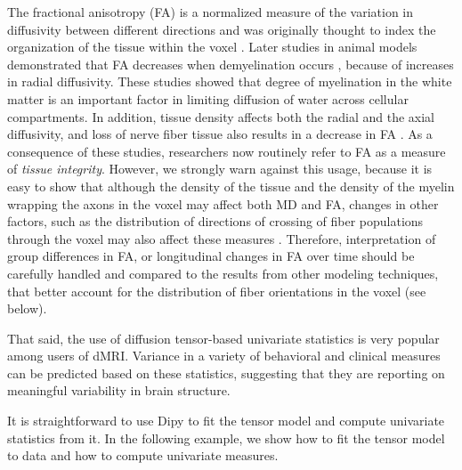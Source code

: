 \documentclass{bioinfo}
\begin{document}
The fractional anisotropy (FA) is a normalized measure of the variation in
diffusivity between different directions and was originally thought to index
the organization of the tissue within the voxel \citep{Basser1996}. Later
studies in animal models demonstrated that FA decreases when demyelination
occurs \citep{Song2002}, because of increases in radial diffusivity. These
studies showed that degree of myelination in the white matter is an important
factor in limiting diffusion of water across cellular compartments. In
addition, tissue density affects both the radial and the axial diffusivity, and
loss of nerve fiber tissue also results in a decrease in FA \citep{Beaulieu1996,
Beaulieu2002}. As a consequence of these studies, researchers now routinely
refer to FA as a measure of \emph{tissue integrity}. However, we
strongly warn against this usage, because it is easy to show that
although the density of the
tissue and the density of the myelin wrapping the axons in the voxel may affect
both MD and FA, changes in other factors, such as the distribution of
directions of crossing of fiber populations through the voxel may also affect
these measures
\citep{Basser1996,wandell-yeatman:13,jones-etal:13}. Therefore,
interpretation
of group differences in FA, or longitudinal changes in FA over time should be
carefully handled and compared to the results from other modeling techniques,
that better account for the distribution of fiber orientations in the voxel
(see below).

That said, the use of diffusion tensor-based univariate statistics is very popular among
users of dMRI. Variance in a variety of
behavioral \citep{Ben-Shachar2007} and clinical \citep{Thomason2011} measures
can be predicted based on these statistics, suggesting that they are reporting
on meaningful variability in brain structure.

It is straightforward to use Dipy to fit the tensor model and compute univariate
statistics from it.  In the following example, we show how to fit the tensor
model to data and how to compute univariate measures.
\end{document}
